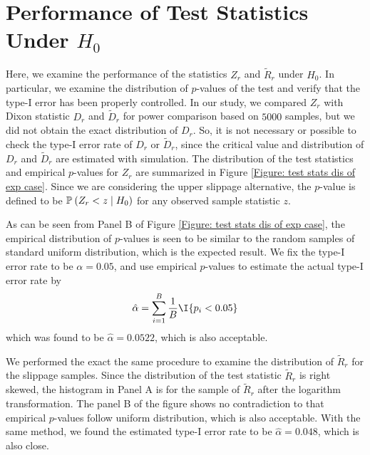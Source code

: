 \documentclass{report}
\begin{document}
\section{Performance of Test Statistics Under $H_0$}

Here, we examine the performance of the statistics $Z_r$ and $\tilde R_r$ under $H_0$. In particular, we examine the distribution of $p$-values of the test and
verify that the type-I error has been properly controlled.
In our study, we compared $Z_r$ with Dixon statistic $D_r$ and $\tilde D_r$ for
power comparison based on $5000$ samples, but we did not obtain the exact distribution of $D_r$. So, it is not necessary or possible
to check the type-I error rate of $D_r$ or $\tilde D_r$, since the critical value and distribution of $D_r$ and $\tilde D_r$ are estimated with simulation.
The distribution of the test statistics and empirical $p$-values for $Z_r$ are summarized in Figure \ref{Figure: test stats dis of exp case}.
Since we are considering the upper slippage alternative, the $p$-value is defined to be $\P{Z_r < z \mid H_0}$ for any observed sample statistic $z$.

As can be seen from Panel B of Figure \ref{Figure: test stats dis of exp case}, the empirical distribution of $p$-values is seen to be similar to the
random samples of standard uniform distribution, which is the expected result. We fix the type-I error rate to be $\alpha = 0.05$, and use empirical
$p$-values to estimate the actual type-I error rate by
\[ 
    \hat \alpha = \sumi{B} \frac{1}{B} \I{p_i < 0.05}
\]   
which was found to be $\hat \alpha = 0.0522$, which is also acceptable.

We performed the exact the same procedure to examine the distribution of $\tilde R_r$ for the slippage samples. Since the distribution of the test statistic
$\tilde R_r$ is right skewed, the histogram in Panel A is for the sample of $\tilde R_r$ after the logarithm transformation. The panel B of
the figure shows no contradiction to that empirical $p$-values follow uniform distribution, which is also acceptable.
With the same method, we found the estimated type-I error rate to be $\hat \alpha = 0.048$, which is also close.
\end{document}
